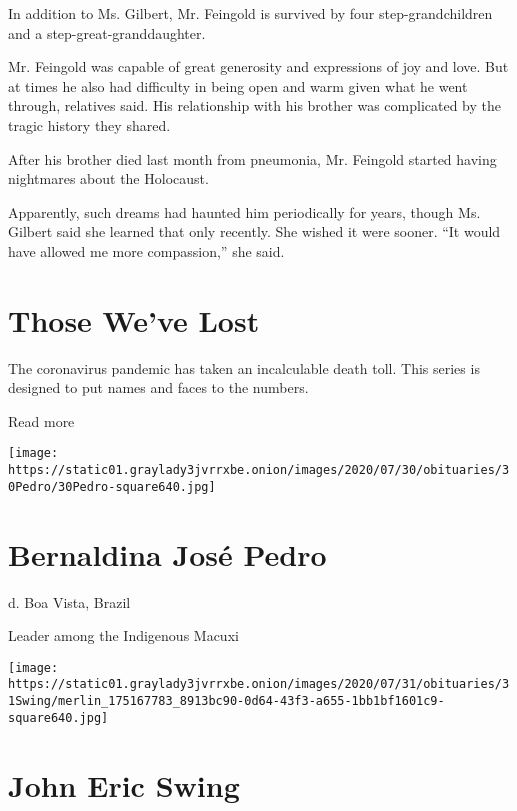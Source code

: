 In addition to Ms. Gilbert, Mr. Feingold is survived by four
step-grandchildren and a step-great-granddaughter.

Mr. Feingold was capable of great generosity and expressions of joy and
love. But at times he also had difficulty in being open and warm given
what he went through, relatives said. His relationship with his brother
was complicated by the tragic history they shared.

After his brother died last month from pneumonia, Mr. Feingold started
having nightmares about the Holocaust.

Apparently, such dreams had haunted him periodically for years, though
Ms. Gilbert said she learned that only recently. She wished it were
sooner. ``It would have allowed me more compassion,'' she said.

\href{https://www.nytimes3xbfgragh.onion/interactive/2020/obituaries/people-died-coronavirus-obituaries.html?action=click\&pgtype=Article\&state=default\&region=BELOW_MAIN_CONTENT\&context=covid_obits_promo}{}

\hypertarget{those-weve-lost}{%
\section{Those We've Lost}\label{those-weve-lost}}

The coronavirus pandemic has taken an incalculable death toll. This
series is designed to put names and faces to the numbers.

Read more

\texttt{[image: https://static01.graylady3jvrrxbe.onion/images/2020/07/30/obituaries/30Pedro/30Pedro-square640.jpg]}

\hypertarget{bernaldina-josuxe9-pedro}{%
\section{Bernaldina José Pedro}\label{bernaldina-josuxe9-pedro}}

d. Boa Vista, Brazil

Leader among the Indigenous Macuxi

\texttt{[image: https://static01.graylady3jvrrxbe.onion/images/2020/07/31/obituaries/31Swing/merlin\_175167783\_8913bc90-0d64-43f3-a655-1bb1bf1601c9-square640.jpg]}

\hypertarget{john-eric-swing}{%
\section{John Eric Swing}\label{john-eric-swing}}


